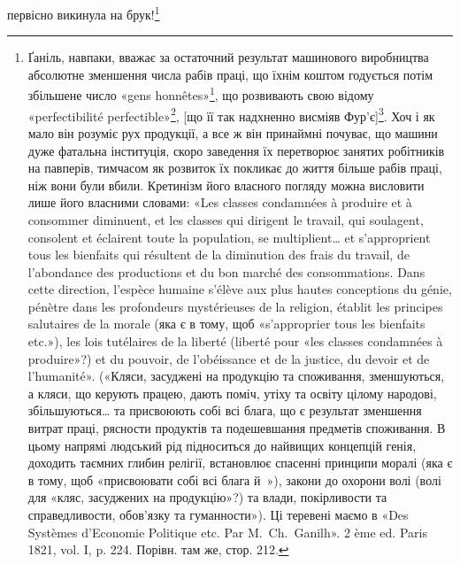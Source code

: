 первісно викинула на брук!\footnote{
Ґаніль, навпаки, вважає за остаточний результат машинового виробництва
абсолютне зменшення числа рабів праці, що їхнім коштом годується
потім збільшене число «gens honnêtes»\footnote*{
порядних людей. \emph{Ред.}
}, що розвивають свою відому
«perfectibilité perfectible»\footnote*{
здібну вдосконалюватися здібність до вдосконалення. \emph{Ред.}
}, [що її так надхненно висміяв Фур’є]\footnote*{
Заведений у прямі дужки кінець речення беремо з французького
видання. \emph{Ред.}
}. Хоч і як мало він розуміє рух продукції, а все ж він принаймні почуває,
що машини дуже фатальна інституція, скоро заведення їх перетворює
занятих робітників на павперів, тимчасом як розвиток їх покликає до
життя більше рабів праці, ніж вони були вбили. Кретинізм його власного
погляду можна висловити лише його власними словами: «Les classes
condamnées à produire et à consommer diminuent, et les classes qui dirigent
le travail, qui soulagent, consolent et éclairent toute la population,
se multiplient\dots{} et s’approprient tous les bienfaits qui résultent de la diminution
des frais du travail, de l’abondance des productions et du bon marché
des consommations. Dans cette direction, l’espèce humaine s’élève aux plus
hautes conceptions du génie, pénètre dans les profondeurs mystérieuses de la
religion, établit les principes salutaires de la morale (яка є в тому, щоб «s’approprier
tous les bienfaits etc.»), les lois tutélaires de la liberté (liberté pour
«les classes condamnées à produire»?) et du pouvoir, de l’obéissance et de
la justice, du devoir et de l’humanité». («Кляси, засуджені на продукцію
та споживання, зменшуються, а кляси, що керують працею, дають поміч,
утіху та освіту цілому народові, збільшуються\dots{} та присвоюють собі
всі блага, що є результат зменшення витрат праці, рясности продуктів
та подешевшання предметів споживання. В цьому напрямі людський
рід підноситься до найвищих концепцій генія, доходить таємних глибин
релігії, встановлює спасенні принципи моралі (яка є в тому, щоб «присвоювати
собі всі блага й~»), закони до охорони волі (волі для «кляс,
засуджених на продукцію»?) та влади, покірливости та справедливости,
обов’язку та гуманности»). Ці теревені маємо в «Des Systèmes d’Economie
Politique etc. Par M.~Ch.~Ganilh». 2 ème ed. Paris 1821, vol. I, p. 224.
Порівн. там же, стор. 212.
}

